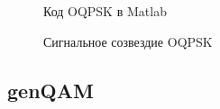 \documentclass[a4paper,14pt]{extarticle}
\begin{document}
\begin{figure}[H]
\caption{Код OQPSK в Matlab}
\label{5}
\end{figure}

\begin{figure}[H]
\caption{Сигнальное созвездие OQPSK}
\label{6}
\end{figure}

\subsection{genQAM}
\end{document}
